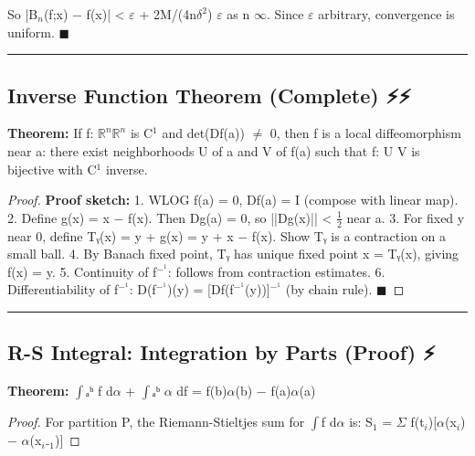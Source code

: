 \documentclass[12pt,a4paper,openany]{book}
\begin{document}
{{So |B$_n$(f;x) − f(x)| < $\varepsilon$ + 2M/(4n$\delta^2$)  $\varepsilon$ as n  $\infty$. Since $\varepsilon$ arbitrary, convergence is uniform. $\blacksquare$

\bigskip\noindent\rule{\textwidth}{0.4pt}\bigskip

\subsection{Inverse Function Theorem (Complete) ⚡⚡}

\begin{tcolorbox}[colback=lightblue,colframe=thmblue,title=\textbf{Theorem},breakable,boxrule=1.5pt]
\textbf{Theorem:} If f: $\mathbb{R}^n\mathbb{R}^n$ is C$^1$ and det(Df(a)) $\neq$ 0, then f is a local diffeomorphism near a: there exist neighborhoods U of a and V of f(a) such that f: U  V is bijective with C$^1$ inverse.
\end{tcolorbox}

\begin{proof}
\textbf{Proof sketch:}
1. WLOG f(a) = 0, Df(a) = I (compose with linear map).
2. Define g(x) = x − f(x). Then Dg(a) = 0, so ||Dg(x)|| < $\frac{1}{2}$ near a.
3. For fixed y near 0, define Tᵧ(x) = y + g(x) = y + x − f(x). Show Tᵧ is a contraction on a small ball.
4. By Banach fixed point, Tᵧ has unique fixed point x = Tᵧ(x), giving f(x) = y.
5. Continuity of f$^{-}^1$: follows from contraction estimates.
6. Differentiability of f$^{-}^1$: D(f$^{-}^1$)(y) = [Df(f$^{-}^1$(y))]$^{-}^1$ (by chain rule). $\blacksquare$
\end{proof}

\bigskip\noindent\rule{\textwidth}{0.4pt}\bigskip

\subsection{R-S Integral: Integration by Parts (Proof) ⚡}

\begin{tcolorbox}[colback=lightblue,colframe=thmblue,title=\textbf{Theorem},breakable,boxrule=1.5pt]
\textbf{Theorem:} $\int$ₐᵇ f d$\alpha$ + $\int$ₐᵇ $\alpha$ df = f(b)$\alpha$(b) − f(a)$\alpha$(a)
\end{tcolorbox}

\begin{proof}

For partition P, the Riemann-Stieltjes sum for $\int$f d$\alpha$ is:
S$_1$ = $\Sigma$ f(t$_i$)[$\alpha$(x$_i$) − $\alpha$(x$_i$₋$_1$)]
\end{proof}

}}
\end{document}
